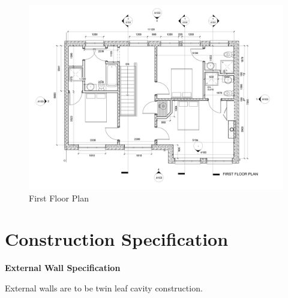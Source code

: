 \begin{figure}[th]
	\centering
	\includegraphics[width=1.0\linewidth]{./img/P01FirstFloorLevel.jpg}
	\caption{First Floor Plan}
	\label{fig:p01firstfloorlevel}
\end{figure}


\newpage
\section*{Construction Specification}


\textbf{External Wall Specification} 

External walls are to be twin leaf cavity construction.

